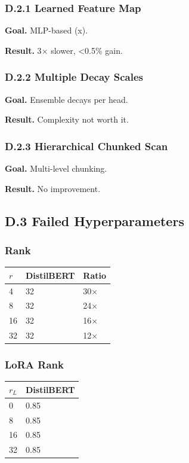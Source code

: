 \subsubsection{D.2.1 Learned Feature Map}

\textbf{Goal.} MLP-based  (x).

\textbf{Result.} 3$\times$ slower, <0.5\% gain.

\subsubsection{D.2.2 Multiple Decay Scales}

\textbf{Goal.} Ensemble decays per head.

\textbf{Result.} Complexity not worth it.

\subsubsection{D.2.3 Hierarchical Chunked Scan}

\textbf{Goal.} Multi-level chunking.

\textbf{Result.} No improvement.

\subsection{D.3 Failed Hyperparameters}

\subsubsection{Rank}

\begin{table}[H]
\centering
\small
\begin{tabular}{lll}
\toprule
\textbf{$r$} & \textbf{DistilBERT} & \textbf{Ratio} \\
\midrule
4 & 32 & 30$\times$ \\
8 & 32 & 24$\times$ \\
16 & 32 & 16$\times$ \\
32 & 32 & 12$\times$ \\
\bottomrule
\end{tabular}
\end{table}

\subsubsection{LoRA Rank}

\begin{table}[H]
\centering
\small
\begin{tabular}{ll}
\toprule
\textbf{$r_L$} & \textbf{DistilBERT} \\
\midrule
0 & 0.85 \\
8 & 0.85 \\
16 & 0.85 \\
32 & 0.85 \\
\bottomrule
\end{tabular}
\end{table}

